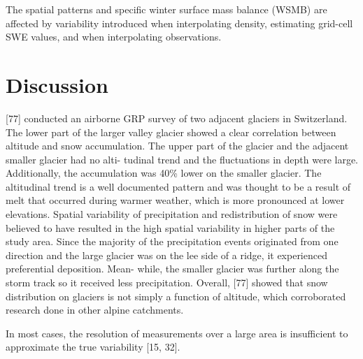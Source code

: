 \documentclass[twocolumn,letterpaper]{igs}
\begin{document}
The spatial patterns and specific winter surface mass balance (WSMB) are affected by variability introduced when interpolating density, estimating grid-cell SWE values, and when interpolating observations.  









\section{Discussion}
[77] conducted an airborne GRP survey of two adjacent glaciers in Switzerland. The
lower part of the larger valley glacier showed a clear correlation between altitude and snow
accumulation. The upper part of the glacier and the adjacent smaller glacier had no alti-
tudinal trend and the fluctuations in depth were large. Additionally, the accumulation was
40\% lower on the smaller glacier. The altitudinal trend is a well documented pattern and
was thought to be a result of melt that occurred during warmer weather, which is more
pronounced at lower elevations. Spatial variability of precipitation and redistribution of
snow were believed to have resulted in the high spatial variability in higher parts of the
study area. Since the majority of the precipitation events originated from one direction and
the large glacier was on the lee side of a ridge, it experienced preferential deposition. Mean-
while, the smaller glacier was further along the storm track so it received less precipitation.
Overall, [77] showed that snow distribution on glaciers is not simply a function of altitude,
which corroborated research done in other alpine catchments.

 In most cases, the resolution of measurements over a large area is insufficient to
approximate the true variability [15, 32].
\end{document}
